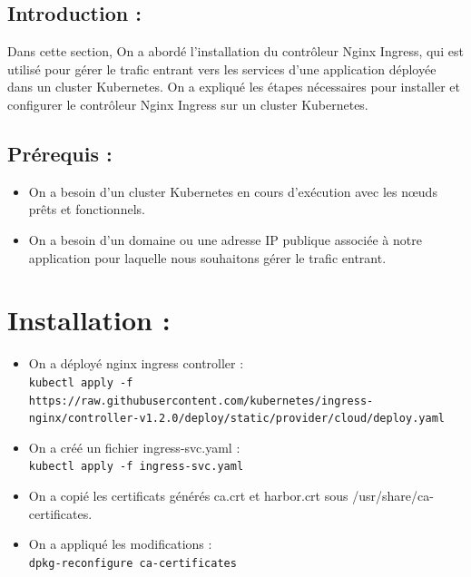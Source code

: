 \subsection*{Introduction :}

Dans cette section, On a abordé l’installation du contrôleur Nginx Ingress, qui est utilisé pour gérer le trafic entrant vers les services d’une application déployée dans un cluster Kubernetes. On a expliqué les étapes nécessaires pour installer et configurer le contrôleur Nginx Ingress sur un cluster Kubernetes.

\subsection*{Prérequis :}

\begin{itemize}
\item On a besoin d’un cluster Kubernetes en cours d’exécution avec les nœuds prêts et fonctionnels.
\end{itemize}
\begin{itemize}
\item On a besoin d’un domaine ou une adresse IP publique associée à notre application pour laquelle nous souhaitons gérer le trafic entrant.
\end{itemize}

\section*{Installation :}

\begin{itemize}

\item On a déployé nginx ingress controller : \\
\texttt{kubectl apply -f https://raw.githubusercontent.com/kubernetes/ingress-nginx/controller-v1.2.0/deploy/static/provider/cloud/deploy.yaml}

\item On a créé un fichier ingress-svc.yaml : \\
\texttt{kubectl apply -f ingress-svc.yaml}

\item On a copié les certificats générés ca.crt et harbor.crt sous /usr/share/ca-certificates.

\item On a appliqué les modifications : \\
\texttt{dpkg-reconfigure ca-certificates}

\end{itemize}

